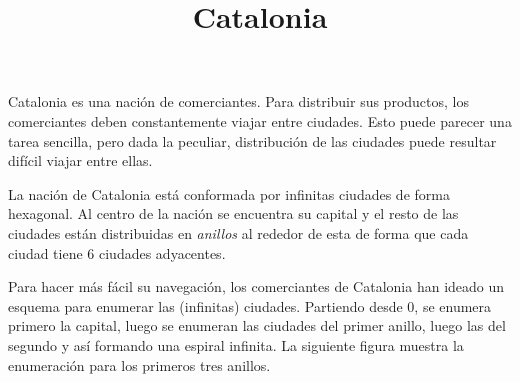 \documentclass{oci}
\title{Catalonia}
\begin{document}
\begin{problemDescription}
Catalonia es una nación de comerciantes.
Para distribuir sus productos, los comerciantes deben constantemente
viajar entre ciudades.
Esto puede parecer una tarea sencilla, pero dada la peculiar, distribución de las ciudades
puede resultar difícil viajar entre ellas.

La nación de Catalonia está conformada por infinitas ciudades de forma hexagonal.
Al centro de la nación se encuentra su capital y el resto de las ciudades están distribuidas
en \emph{anillos} al rededor de esta de forma que cada ciudad tiene 6 ciudades adyacentes.

Para hacer más fácil su navegación, los comerciantes de Catalonia han ideado un esquema
para enumerar las (infinitas) ciudades.
Partiendo desde 0, se enumera primero la capital, luego se enumeran las ciudades del primer anillo,
luego las del segundo y así formando una espiral infinita.
La siguiente figura muestra la enumeración para los primeros tres anillos.

\newdimen\R
\R=1cm
\newcommand{\hex}[3][]{
  \begin{scope}[rotate=90, xshift=#3*1.5*\R, yshift=#2*-0.866*\R]
  \draw[thick,#1] (0:\R) \foreach \x in {60, 120,...,359} {
    --(\x:\R)
  } -- cycle(90:\R);
  \end{scope}
}
\newcommand{\pos}[2]{
  #1*0.866*\R, #2*1.5*\R
}
\begin{center}
\end{center}
\end{problemDescription}
\end{document}
